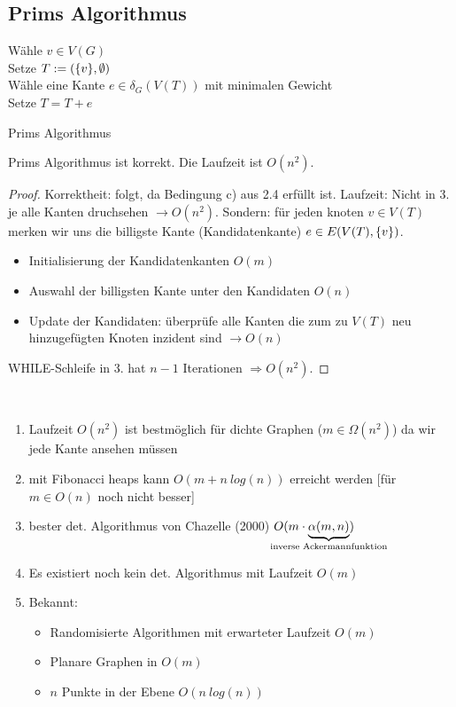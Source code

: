 \subsection*{Prims Algorithmus}
\begin{algorithm}
	\vspace*{5pt}
	Wähle $v\in V(G)$\\
	Setze $T:=(\{v\}, \emptyset)$\\
	{
		Wähle eine Kante $e\in \delta_G(V(T))$ mit minimalen Gewicht\\
		Setze $T=T+e$
	}
	\caption{Prims Algorithmus}
	\label{fig:Algorithmus}
\end{algorithm}
\begin{satz}
	Prims Algorithmus ist korrekt. Die Laufzeit ist $O(n^2)$.
\end{satz}
\begin{proof}
	Korrektheit: folgt, da Bedingung c) aus 2.4 erfüllt ist. Laufzeit: Nicht in 3. je alle Kanten druchsehen $\to O(n^2)$. Sondern: für jeden knoten $v\in V(T)$ merken wir uns die billigste Kante (\dq Kandidatenkante\dq) $e\in E(V(T), \{v\})$.
	\begin{itemize}
		\item Initialisierung der Kandidatenkanten $O(m)$
		\item Auswahl der billigsten Kante unter den Kandidaten $O(n)$
		\item Update der Kandidaten: überprüfe alle Kanten die zum zu $V(T)$ neu hinzugefügten Knoten inzident sind $\to O(n)$
	\end{itemize}
	WHILE-Schleife in 3. hat $n-1$ Iterationen $\Rightarrow O(n^2)$.
\end{proof}
\begin{rem}~
	\begin{enumerate}
		\item Laufzeit $O(n^2)$ ist bestmöglich für dichte Graphen ($m\in \Omega(n^2)$) da wir jede Kante ansehen müssen
		\item mit Fibonacci heaps kann $O(m+n~log(n))$ erreicht werden [für $m\in O(n)$ noch nicht besser]
		\item bester det. Algorithmus von Chazelle (2000) $O(m\cdot \underbrace{\alpha(m,n)}_{\mathclap{\text{inverse Ackermannfunktion}}})$
		\item Es existiert noch kein det. Algorithmus mit Laufzeit $O(m)$
		\item Bekannt:
		\begin{itemize}
			\item Randomisierte Algorithmen mit erwarteter Laufzeit $O(m)$
			\item Planare Graphen in $O(m)$
			\item $n$ Punkte in der Ebene $O(n~log(n))$
		\end{itemize}
	\end{enumerate}
\end{rem}
	